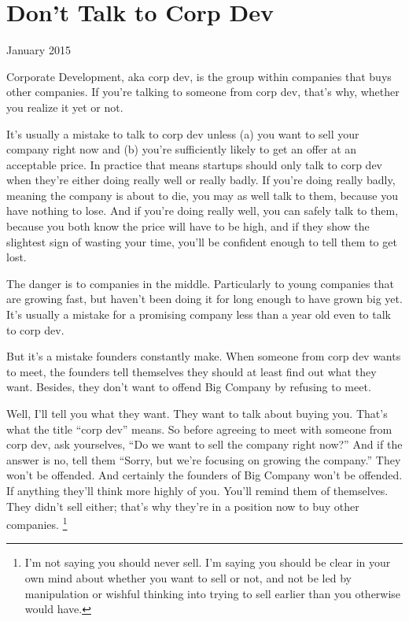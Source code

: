 \chapter{Don't Talk to Corp Dev}

January 2015

Corporate Development, aka corp dev, is the group within companies that
buys other companies. If you're talking to someone from corp dev, that's
why, whether you realize it yet or not.

It's usually a mistake to talk to corp dev unless (a) you want to sell
your company right now and (b) you're sufficiently likely to get an
offer at an acceptable price. In practice that means startups should
only talk to corp dev when they're either doing really well or really
badly. If you're doing really badly, meaning the company is about to
die, you may as well talk to them, because you have nothing to lose. And
if you're doing really well, you can safely talk to them, because you
both know the price will have to be high, and if they show the slightest
sign of wasting your time, you'll be confident enough to tell them to
get lost.

The danger is to companies in the middle. Particularly to young
companies that are growing fast, but haven't been doing it for long
enough to have grown big yet. It's usually a mistake for a promising
company less than a year old even to talk to corp dev.

But it's a mistake founders constantly make. When someone from corp dev
wants to meet, the founders tell themselves they should at least find
out what they want. Besides, they don't want to offend Big Company by
refusing to meet.

Well, I'll tell you what they want. They want to talk about buying you.
That's what the title ``corp dev'' means. So before agreeing to meet
with someone from corp dev, ask yourselves, ``Do we want to sell the
company right now?'' And if the answer is no, tell them ``Sorry, but
we're focusing on growing the company.'' They won't be offended. And
certainly the founders of Big Company won't be offended. If anything
they'll think more highly of you. You'll remind them of themselves. They
didn't sell either; that's why they're in a position now to buy other
companies. \footnote{I'm not saying you should never sell. I'm saying you should be
clear in your own mind about whether you want to sell or not, and not be
led by manipulation or wishful thinking into trying to sell earlier than
you otherwise would have.}

